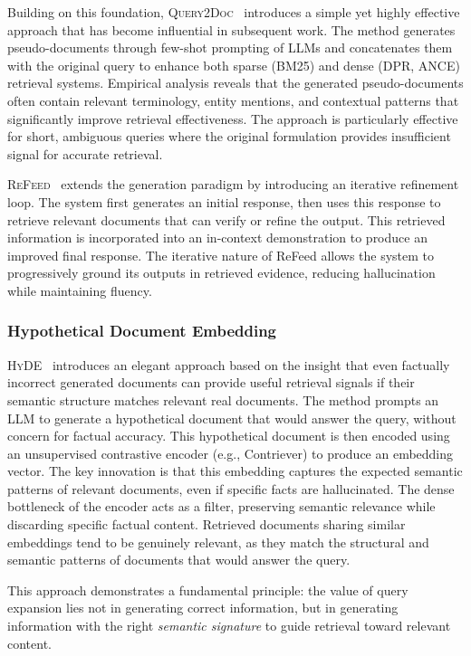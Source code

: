 \documentclass{article}
\begin{document}
Building on this foundation, \textsc{Query2Doc}~\citep{Query2doc} introduces a simple yet highly effective approach that has become influential in subsequent work. The method generates pseudo-documents through few-shot prompting of LLMs and concatenates them with the original query to enhance both sparse (BM25) and dense (DPR, ANCE) retrieval systems. Empirical analysis reveals that the generated pseudo-documents often contain relevant terminology, entity mentions, and contextual patterns that significantly improve retrieval effectiveness. The approach is particularly effective for short, ambiguous queries where the original formulation provides insufficient signal for accurate retrieval.

\textsc{ReFeed}~\citep{ReFeed} extends the generation paradigm by introducing an iterative refinement loop. The system first generates an initial response, then uses this response to retrieve relevant documents that can verify or refine the output. This retrieved information is incorporated into an in-context demonstration to produce an improved final response. The iterative nature of ReFeed allows the system to progressively ground its outputs in retrieved evidence, reducing hallucination while maintaining fluency.

\subsubsection{Hypothetical Document Embedding}

\textsc{HyDE}~\citep{HyDE} introduces an elegant approach based on the insight that even factually incorrect generated documents can provide useful retrieval signals if their semantic structure matches relevant real documents. The method prompts an LLM to generate a hypothetical document that would answer the query, without concern for factual accuracy. This hypothetical document is then encoded using an unsupervised contrastive encoder (e.g., Contriever) to produce an embedding vector. The key innovation is that this embedding captures the expected semantic patterns of relevant documents, even if specific facts are hallucinated. The dense bottleneck of the encoder acts as a filter, preserving semantic relevance while discarding specific factual content. Retrieved documents sharing similar embeddings tend to be genuinely relevant, as they match the structural and semantic patterns of documents that would answer the query.

This approach demonstrates a fundamental principle: the value of query expansion lies not in generating correct information, but in generating information with the right \textit{semantic signature} to guide retrieval toward relevant content.
\end{document}
